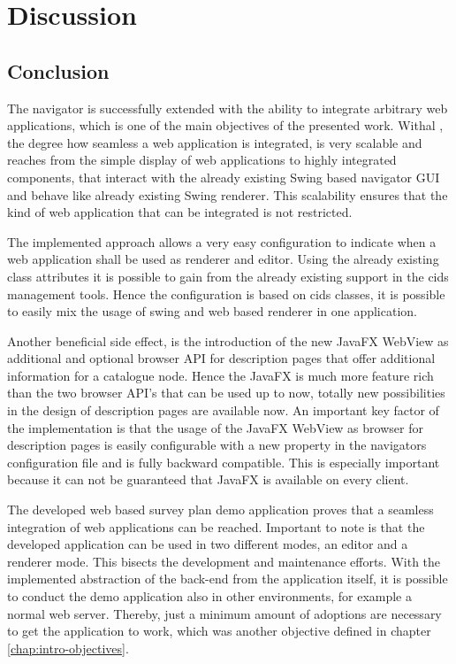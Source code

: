 \chapter{Discussion}

\section{Conclusion}

The navigator is successfully extended with the ability to integrate arbitrary web applications, which is one of the main objectives of the presented work. 
Withal , the degree how seamless a web application is integrated, is very scalable and reaches from the simple display of web applications to highly integrated components, that interact with the already existing Swing based navigator GUI and behave like already existing Swing renderer.  
This scalability ensures that the kind of web application that can be integrated is not restricted.

The implemented approach allows a very easy configuration to indicate when a web application shall be used as renderer and editor. 
Using the already existing class attributes it is possible to gain  from the already existing support in the cids management tools. 
Hence the configuration is based on cids classes, it is possible to easily mix the usage of swing and web based renderer in one application.

Another beneficial side effect, is the introduction of the new JavaFX WebView as additional and optional browser API for description pages that offer additional information for a catalogue node.
Hence the JavaFX is much more feature rich than the two browser API's that can be used up to now, totally  new possibilities in the design of description pages are available now. 
An important key factor of the implementation is that the usage of the JavaFX WebView as browser for description pages is easily configurable with a new property in the navigators configuration file and is fully backward compatible. 
This is especially important because it can not be guaranteed that JavaFX is available on every client.

The developed web based survey plan demo application proves that a seamless integration of web applications can be reached. 
Important to note is that the developed application can be used in two different modes, an editor and a renderer mode. 
This bisects the development and maintenance efforts.
With the implemented abstraction of the back-end from the application itself, it is possible to conduct the demo application also in other environments, for example a normal web server. Thereby, just a minimum amount of adoptions are necessary to get the application to work, which was another objective defined in chapter \ref{chap:intro-objectives}.

